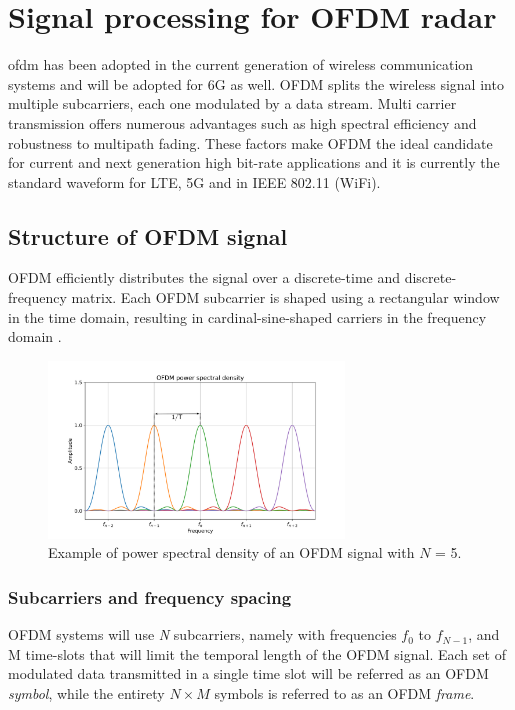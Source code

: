 \chapter{Signal processing for OFDM radar}
\label{chap:theoretical_OFDM}

\gls{ofdm} has been adopted in the current generation of wireless communication systems and will be adopted for 6G as well.
OFDM splits the wireless signal into multiple subcarriers, each one modulated by a data stream. Multi carrier transmission offers numerous advantages such as high spectral efficiency and robustness to multipath fading. These factors make OFDM the ideal candidate for current and next generation high bit-rate applications and it is currently the standard waveform for LTE, 5G and in IEEE 802.11 (WiFi).

\section{Structure of OFDM signal}

OFDM efficiently distributes the signal over a discrete-time and discrete-frequency matrix. Each OFDM subcarrier is shaped using a rectangular window in the time domain, resulting in cardinal-sine-shaped carriers in the frequency domain \cite{Schaich_Wild_2014}.

\begin{figure}[H]
    \centering
    \includegraphics[width=0.7\textwidth]{Images/theoretical/ofdm/ofdm_psd_mod.png}
    \caption{Example of power spectral density of an OFDM signal with $N$ = 5.}
    \label{fig:quadtree}
\end{figure}

\subsection{Subcarriers and frequency spacing}
OFDM systems will use \textit{N} subcarriers, namely with frequencies $f_0$ to $f_{N-1}$, and M time-slots that will limit the temporal length of the OFDM signal.
Each set of modulated data transmitted in a single time slot will be referred as an OFDM \textit{symbol}, while the entirety $N\times M$ symbols is referred to as an OFDM \textit{frame}.

